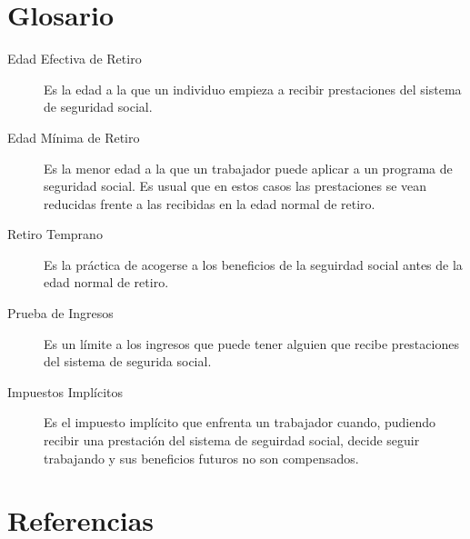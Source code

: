 \documentclass[]{article}
\begin{document}
\hypertarget{glosario}{%
\section{Glosario}\label{glosario}}

\begin{description}
\item[Edad Efectiva de Retiro]
Es la edad a la que un individuo empieza a recibir prestaciones del
sistema de seguridad social.
\item[Edad Mínima de Retiro]
Es la menor edad a la que un trabajador puede aplicar a un programa de
seguridad social. Es usual que en estos casos las prestaciones se vean
reducidas frente a las recibidas en la edad normal de retiro.
\item[Retiro Temprano]
Es la práctica de acogerse a los beneficios de la seguirdad social antes
de la edad normal de retiro.
\item[Prueba de Ingresos]
Es un límite a los ingresos que puede tener alguien que recibe
prestaciones del sistema de segurida social.
\item[Impuestos Implícitos]
Es el impuesto implícito que enfrenta un trabajador cuando, pudiendo
recibir una prestación del sistema de seguirdad social, decide seguir
trabajando y sus beneficios futuros no son compensados.
\end{description}

\hypertarget{referencias}{%
\section{Referencias}\label{referencias}}
\end{document}
